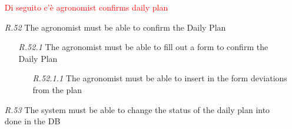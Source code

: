 \begin{itemize}
    \textcolor{red}{Di seguito c'è agronomist confirms daily plan} 
        
    \item [\textit{R.52}]The agronomist must be able to confirm the Daily Plan
    \begin{itemize}
        \item [\textit{R.52.1}] The agronomist must be able to fill out a form to confirm the Daily Plan
        \begin{itemize}
        \item [\textit{R.52.1.1}] The agronomist must be able to insert in the form deviations from the plan
        \end{itemize}
    \end{itemize}
    \item [\textit{R.53}]The system must be able to change the status of the daily plan into done in the DB
\end{itemize}